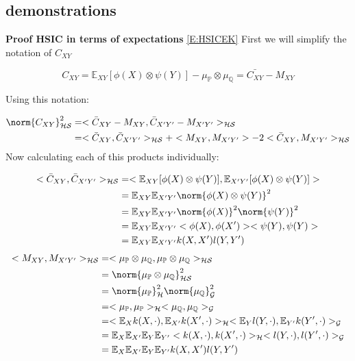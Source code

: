 \subsection{demonstrations}
\textbf{Proof HSIC in terms of expectations} \ref{E:HSICEK}
First we will simplify the notation of $C_{XY}$

\vspace{5mm}
$$ C_{XY} = \mathbb{E}_{XY}[\phi(X) \otimes \psi(Y)] - \mu_{\mathbb{P}} \otimes \mu_{\mathbb{Q}} = \bar{C_{XY}} - M_{XY}$$

Using this notation:

\begin{equation}{}
\begin{split}
\norm{C_{XY}}^{2}_{\mathcal{HS}}
& = <\bar{C}_{XY} - M_{XY},\bar{C}_{X'Y'} - M_{X'Y'}>_{\mathcal{HS}} \\
& = <\bar{C}_{XY},\bar{C}_{X'Y'}>_{\mathcal{HS}}+< M_{XY}, M_{X'Y'}>-2<\bar{C}_{XY}, M_{X'Y'}>_{\mathcal{HS}}
\end{split}
\end{equation}
Now calculating each of this products individually:

\begin{equation}{}
\begin{split}
<\bar{C}_{XY},\bar{C}_{X'Y'}>_{\mathcal{HS}} 
& = <\mathbb{E}_{XY}[\phi(X) \otimes \psi(Y)],\mathbb{E}_{X'Y'}[\phi(X) \otimes \psi(Y)] >\\
& = \mathbb{E}_{XY}\mathbb{E}_{X'Y'}\norm{\phi(X) \otimes \psi(Y)}^{2} \\
& = \mathbb{E}_{XY}\mathbb{E}_{X'Y'}\norm{\phi(X)}^{2}\norm{\psi(Y)}^{2}\\
& = \mathbb{E}_{XY}\mathbb{E}_{X'Y'}<\phi(X),\phi(X')><\psi(Y),\psi(Y)> \\
& = \mathbb{E}_{XY}\mathbb{E}_{X'Y'} k(X,X')l(Y,Y') \\
\end{split}
\end{equation}
\begin{equation}{}
\begin{split}
<M_{XY},M_{X'Y'}>_{\mathcal{HS}}
& = <\mu_{\mathbb{P}}\otimes\mu_{\mathbb{Q}},\mu_{\mathbb{P}}\otimes\mu_{\mathbb{Q}}>_{\mathcal{HS}} \\
& = \norm{\mu_{\mathbb{P}}\otimes\mu_{\mathbb{Q}}}^{2}_{\mathcal{HS}} \\
& = \norm{\mu_{\mathbb{P}}}^{2}_{\mathcal{H}}\norm{\mu_{\mathbb{Q}}}^{2}_{\mathcal{G}} \\
& = <\mu_{\mathbb{P}},\mu_{\mathbb{P}}>_{\mathcal{H}}<\mu_{\mathbb{Q}},\mu_{\mathbb{Q}}>_{\mathcal{G}} \\
& = <\mathbb{E}_{X}k(X,\cdot),\mathbb{E}_{X'}k(X',\cdot)>_{\mathcal{H}}<\mathbb{E}_{Y}l(Y,\cdot),\mathbb{E}_{Y'}k(Y',\cdot)>_{\mathcal{G}} \\
& = \mathbb{E}_{X}\mathbb{E}_{X'}\mathbb{E}_{Y}\mathbb{E}_{Y'}<k(X,\cdot),k(X',\cdot)>_{\mathcal{H}}<l(Y,\cdot),l(Y',\cdot)>_{\mathcal{G}} \\
& = \mathbb{E}_{X}\mathbb{E}_{X'}\mathbb{E}_{Y}\mathbb{E}_{Y'}k(X,X')l(Y,Y') \\
\end{split}
\end{equation}

